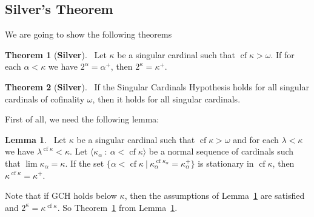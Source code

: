 \documentclass[8pt]{article}
\theoremstyle{definition}
\theoremstyle{definition}
\newtheorem{theorem}{Theorem}[section]
\theoremstyle{definition}
\theoremstyle{definition}
\theoremstyle{definition}
\theoremstyle{definition}
\theoremstyle{definition}
\theoremstyle{definition}
\newtheorem{lemma}{Lemma}[section]
\theoremstyle{definition}
\theoremstyle{definition}
\theoremstyle{definition}
\theoremstyle{definition}
\theoremstyle{definition}
\theoremstyle{definition}
\theoremstyle{question}
\begin{document}
\subsection{Silver's Theorem}

We are going to show the following theorems

\begin{theorem}[\bf Silver]~\label{silver:1}
  Let $\kappa$ be a singular cardinal such that $\operatorname{cf} \kappa > \omega$.
  If for each $\alpha < \kappa$ we have $2^{\alpha} = \alpha^+$, then $2^{\kappa} = \kappa^+$.
\end{theorem}

\begin{theorem}[\bf Silver]~\label{silver:2}
  If the Singular Cardinals Hypothesis holds for all singular cardinals of cofinality $\omega$, then it holds for all singular cardinals.
\end{theorem}

First of all, we need the following lemma:
\begin{lemma}~\label{silver:lemma} Let $\kappa$ be a singular cardinal such that $\operatorname{cf} \kappa > \omega$ and
  for each $\lambda < \kappa$ we have $\lambda^{\operatorname{cf} \kappa} < \kappa$.
  Let $\langle \kappa_{\alpha} \: : \: \alpha < \operatorname{cf} \kappa \rangle$ be a normal sequence
  of cardinals such that $\lim \kappa_{\alpha} = \kappa$. If the set 
  $\{ \alpha < \operatorname{cf} \kappa \: | \: \kappa^{\operatorname{cf} \kappa_{\alpha}}_{\alpha} = \kappa^+_{\alpha}\}$
  is stationary in $\operatorname{cf} \kappa$, then $\kappa^{\operatorname{cf} \kappa} = \kappa^+$.
\end{lemma}

Note that if GCH holds below $\kappa$, then the assumptions of Lemma~\ref{silver:lemma} are satisfied
and $2^{\kappa} = \kappa^{\operatorname{cf} \kappa}$. So Theorem~\ref{silver:1} from Lemma~\ref{silver:lemma}.
\end{document}
